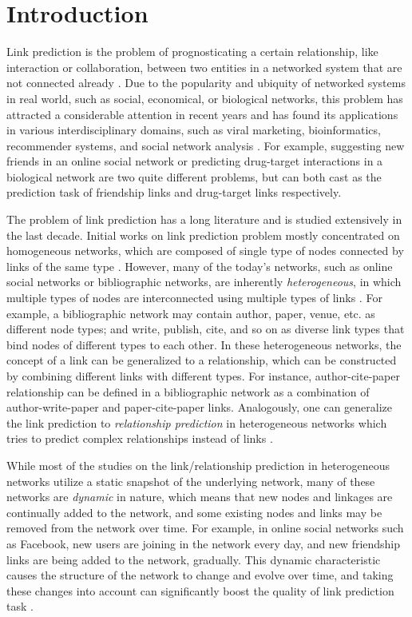 \section{Introduction}\label{sec:intro}
Link prediction is the problem of prognosticating a certain relationship, like interaction or collaboration, between two entities in a networked system that are not connected already \cite{lu2011link}. Due to the popularity and ubiquity of networked systems in real world, such as social, economical, or biological networks, this problem has attracted a considerable attention in recent years and has found its applications in various interdisciplinary domains, such as viral marketing, bioinformatics, recommender systems, and social network analysis \cite{wasserman1994social}. For example, suggesting new friends in an online social network \cite{liben2007link} or predicting drug-target interactions in a biological network \cite{chen2012drug} are two quite different problems, but can both cast as the prediction task of friendship links and drug-target links respectively. 

The problem of link prediction has a long literature and is studied extensively in the last decade. Initial works on link prediction problem mostly concentrated on homogeneous networks, which are composed of single type of nodes connected by links of the same type \cite{liben2007link, wang2007local, lichtenwalter2010new}. However, many of the today's networks, such as online social networks or bibliographic networks, are inherently \emph{heterogeneous}, in which multiple types of nodes are interconnected using multiple types of links \cite{taskar2004link, shi2017survey}. For example, a bibliographic network may contain author, paper, venue, etc. as different node types; and write, publish, cite, and so on as diverse link types that bind nodes of different types to each other. In these heterogeneous networks, the concept of a link can be generalized to a relationship, which can be constructed by combining different links with different types. For instance, author-cite-paper relationship can be defined in a bibliographic network as a combination of author-write-paper and paper-cite-paper links. Analogously, one can generalize the link prediction to \emph{relationship prediction} in heterogeneous networks which tries to predict complex relationships instead of links \cite{sun2012will}.

While most of the studies on the link/relationship prediction in heterogeneous networks utilize a static snapshot of the underlying network, many of these networks are \emph{dynamic} in nature, which means that new nodes and linkages are continually added to the network, and some existing nodes and links may be removed from the network over time. For example, in online social networks such as Facebook, new users are joining in the network every day, and new friendship links are being added to the network, gradually. This dynamic characteristic causes the structure of the network to change and evolve over time, and taking these changes into account can significantly boost the quality of link prediction task \cite{potgieter2009temporality}.

